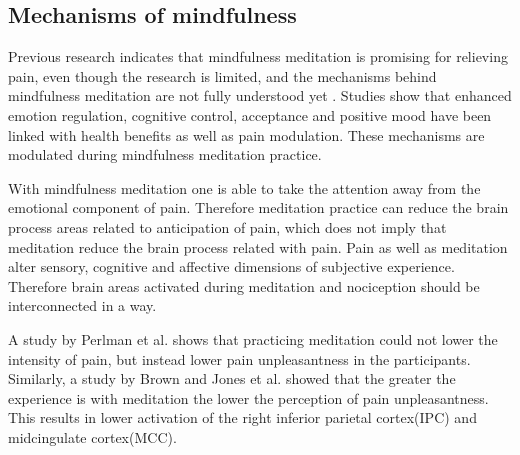 


\subsection{Mechanisms of mindfulness}

Previous research indicates that mindfulness meditation is promising for relieving pain, even though the research is limited, and the mechanisms behind mindfulness meditation are not fully understood yet \cite{Perlman2010}. 
Studies show that enhanced emotion regulation, cognitive control, acceptance and positive mood have been linked with health benefits as well as pain modulation. These mechanisms are modulated during mindfulness meditation practice.

With mindfulness meditation one is able to take the attention away from the emotional component of pain. Therefore meditation practice can reduce the brain process areas related to anticipation of pain, which does not imply that meditation reduce the brain process related with pain. \cite{Brown2010}
Pain as well as meditation alter sensory, cognitive and affective dimensions of subjective experience. Therefore brain areas activated during meditation and nociception should be interconnected in a way. \cite{Zeidan2011}

 A study by Perlman et al. \cite{Perlman2010} shows that practicing meditation could not lower the intensity of pain, but instead lower pain unpleasantness in the participants. \cite{Zeidan2012, Perlman2010} Similarly, a study by Brown and Jones et al. \cite{Brown2010} showed that the greater the experience is with meditation the lower the perception of pain unpleasantness. This results in lower activation of the right inferior parietal cortex(IPC) and midcingulate cortex(MCC).




